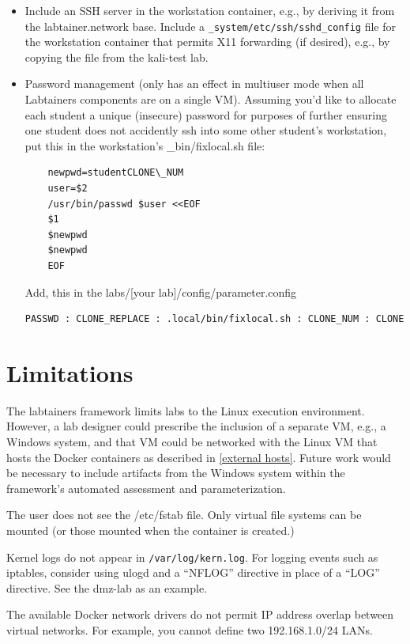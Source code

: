 \documentclass[12pt]{article}
\begin{document}
\begin{itemize}
\item Include an SSH server in the workstation container, e.g., by deriving it from the labtainer.network base.
Include a {\tt \_system/etc/ssh/sshd\_config} file for the workstation container that permits X11 forwarding (if desired),
e.g., by copying the file from the kali-test lab.

\item Password management (only has an effect in multiuser mode when all Labtainers components are on a single VM). 
Assuming you'd like to allocate each student a unique (insecure) password for purposes of
further ensuring one student does not accidently ssh into some other student's workstation, put
this in the workstation's \_bin/fixlocal.sh file:
\begin{verbatim}
    newpwd=studentCLONE\_NUM
    user=$2
    /usr/bin/passwd $user <<EOF
    $1
    $newpwd
    $newpwd
    EOF
\end{verbatim}

\noindent Add, this in the labs/[your lab]/config/parameter.config
\begin{verbatim}
PASSWD : CLONE_REPLACE : .local/bin/fixlocal.sh : CLONE_NUM : CLONE
\end{verbatim}

\end{itemize}

\section{Limitations} \label{limitations}
The labtainers framework limits labs to the Linux execution environment.
However, a lab designer could prescribe the inclusion of a separate
VM, e.g., a Windows system, and that VM could be networked with the Linux
VM that hosts the Docker containers as described in \ref{external hosts}.  
Future work would be necessary to include
artifacts from the Windows system within the framework's automated assessment
and parameterization.

The user does not see the /etc/fstab file.  Only virtual file systems can be
mounted (or those mounted when the container is created.)

Kernel logs do not appear in {\tt /var/log/kern.log}.  For logging events
such as iptables, consider using ulogd and a ``NFLOG'' directive in place of
a ``LOG'' directive.  See the dmz-lab as an example.

The available Docker network drivers do not permit IP address overlap between virtual networks.
For example, you cannot define two 192.168.1.0/24 LANs.
\end{document}
